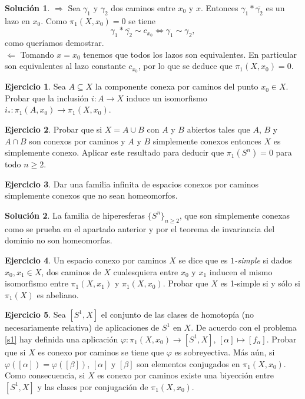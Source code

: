 \documentclass{article}
\theoremstyle{plain}
\theoremstyle{definition}
\newtheorem{exercise}{Ejercicio}
\newtheorem*{sol*}{Solución}
\begin{document}
\begin{sol*}
$\boxed{\Rightarrow}$ Sea $\gamma_1$ y $\gamma_2$ dos caminos entre $x_0$ y $x$. Entonces $\gamma_1*\overline{\gamma_2}$ es un lazo en $x_0$. Como $\pi_1(X,x_0)=0$ se tiene
\[
\gamma_1*\overline{\gamma_2}\sim c_{x_0}\Leftrightarrow \gamma_1\sim\gamma_2,
\]
como queríamos demostrar.\\
$\boxed{\Leftarrow}$ Tomando $x=x_0$ tenemos que todos los lazos son equivalentes. En particular son equivalentes al lazo constante $c_{x_0}$, por lo que se deduce que $\pi_1(X,x_0)=0$.
\end{sol*}


\newpage \begin{exercise} Sea $A\subseteq X$ la componente conexa por caminos del punto $x_0\in X$. Probar que la inclusión
$i: A\to X$ induce un isomorfismo $i_*: \pi_1(A,x_0) \to \pi_1(X,x_0)$.
\end{exercise}

\newpage 

\begin{exercise}
Probar que si $X = A\cup B$ con $A$ y $B$ abiertos tales que $A$, $B$ y $A\cap B$ son conexos por caminos
 y $A$ y $B$ simplemente conexos entonces  $X$ es simplemente conexo. Aplicar este resultado para deducir
 que $\pi_1(S^n) = 0$ para todo $n \geq 2$.
\end{exercise}
\newpage 
\begin{exercise}
Dar una familia infinita de espacios conexos por caminos simplemente conexos que no sean homeomorfos.
\end{exercise}
\begin{sol*}
La familia de hiperesferas $\{S^n\}_{n\geq 2}$, que son simplemente conexas como se prueba en el apartado anterior y por el teorema de invariancia del dominio no son homeomorfas. 
\end{sol*}

\vspace{0.1cm}

\newpage \begin{exercise} Un espacio conexo por caminos $X$ se dice que es {\it $1$-simple} si
dados $x_0, x_1\in X$, dos caminos de $X$ cualesquiera entre $x_0$ y $x_1$ inducen el mismo
isomorfismo entre $\pi_1(X,x_1)$ y $\pi_1(X,x_0)$.
Probar que $X$ es 1-simple si y sólo si $\pi_1(X)$ es abeliano.
\end{exercise}

\newpage 
\begin{exercise}
Sea $[S^1,X]$ el conjunto de las clases de homotopía (no necesariamente relativa) de aplicaciones de $S^1$ en $X$. De acuerdo con el problema \ref{s1} hay definida una aplicación $\varphi: \pi_1(X,x_0) \to [S^1,X]$, $[\alpha] \mapsto [f_{\alpha}]$. Probar que si $X$ es conexo por caminos se tiene que $\varphi$ es sobreyectiva. Más aún, si $\varphi ([\alpha]) = \varphi([\beta])$, $[\alpha]$ y $[\beta]$ son elementos conjugados en $\pi_1(X,x_0)$.
Como consecuencia, si $X$ es conexo por caminos existe una biyección entre $[S^1,X]$ y las clases por conjugación de $\pi_1(X,x_0)$.
\end{exercise}
\end{document}

